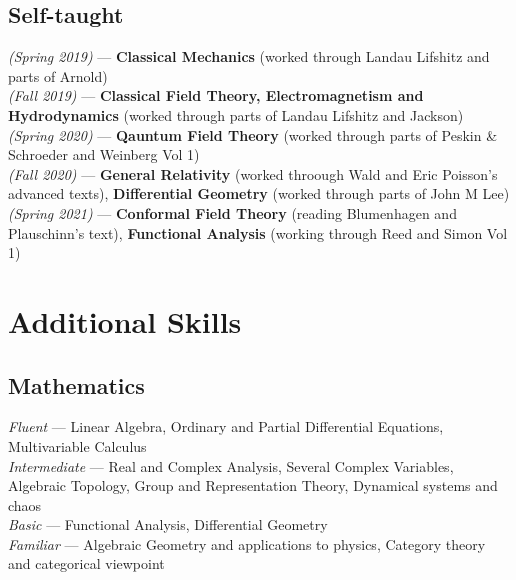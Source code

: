 \documentclass[11pt, a4paper]{article}
\begin{document}
\subsection{\large Self-taught}
\hspace{0.01\linewidth}
\parbox{0.88\linewidth}{
    {\textit{(Spring 2019)} --- \small \textbf{Classical Mechanics} (worked through Landau Lifshitz and parts of Arnold)} \\
    {\textit{(Fall 2019)} --- \small \textbf{Classical Field Theory, Electromagnetism and Hydrodynamics} (worked through parts of Landau Lifshitz and Jackson)} \\
    {\textit{(Spring 2020)} --- \small \textbf{Qauntum Field Theory} (worked through parts of Peskin \& Schroeder and Weinberg Vol 1)} \\
    {\textit{(Fall 2020)} --- \small \textbf{General Relativity} (worked throough Wald and Eric Poisson's advanced texts), \textbf{Differential Geometry} (worked through parts of John M Lee)} \\
    {\textit{(Spring 2021)} --- \small \textbf{Conformal Field Theory} (reading Blumenhagen and Plauschinn's text), \textbf{Functional Analysis} (working through Reed and Simon Vol 1)}
}


\section{Additional Skills}

\subsection{\large Mathematics}
\hspace{0.01\linewidth}
\parbox{0.88\linewidth}{
    {\textit{Fluent} --- \small Linear Algebra, Ordinary and Partial Differential Equations, Multivariable Calculus} \\
    {\textit{Intermediate} --- \small Real and Complex Analysis, Several Complex Variables, Algebraic Topology, Group and Representation Theory, Dynamical systems and chaos} \\
    {\textit{Basic} --- \small Functional Analysis, Differential Geometry} \\
    {\textit{Familiar} --- \small Algebraic Geometry and applications to physics, Category theory and categorical viewpoint}
}
\vspace{-0.3cm}
\end{document}
